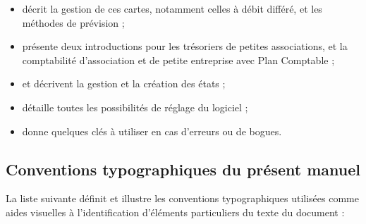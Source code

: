 \begin{itemize}
	\item {} décrit la gestion de ces cartes, notamment celles à débit différé, et les méthodes de prévision ;	
	\item {} présente deux introductions pour les trésoriers de petites associations, et la comptabilité d'association et de petite entreprise avec Plan Comptable ;
	\item {} et  décrivent la gestion et la création des états ;
	\item {} détaille toutes les possibilités de réglage du logiciel ;
	\item {} donne quelques clés à utiliser en cas d'erreurs ou de bogues.
\end{itemize}


\subsection{Conventions typographiques du présent manuel\label{introduction-manual-conventions}}

La liste suivante définit et illustre les conventions typographiques utilisées comme aides visuelles à l'identification d'éléments particuliers du texte du document :

